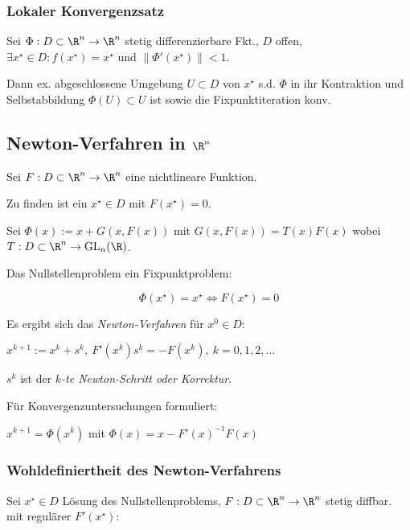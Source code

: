 \subsubsection*{Lokaler Konvergenzsatz}

Sei $\Phi : D \subset \R^n \to \R^n$ stetig differenzierbare Fkt., $D$ offen, $\exists x^\star \in D : f(x^\star)=x^\star$ und $\|\Phi'(x^\star)\| < 1$.

\vspace*{1mm}

Dann ex. abgeschlossene Umgebung $U \subset D$ von $x^\star$ s.d. $\Phi$ in ihr Kontraktion und Selbstabbildung $\Phi(U) \subset U$ ist sowie die Fixpunktiteration konv.

\subsection*{Newton-Verfahren in $\R^n$}

Sei $F : D \subset \R^n \to \R^n$ eine nichtlineare Funktion.

Zu finden ist ein $x^\star \in D$ mit $F(x^\star) = 0$.

\spacing

Sei $\Phi(x) := x + G(x,F(x))$ mit $G(x,F(x)) = T(x)F(x)$ wobei $T : D \subset \R^n \to \text{GL}_n(\R)$.

Das Nullstellenproblem ein Fixpunktproblem:

\vspace*{-2mm}
\[ \Phi(x^\star) = x^\star \iff F(x^\star) = 0 \]

Es ergibt sich das \emph{Newton-Verfahren} für $x^0 \in D$:

$x^{k+1} := x^k + s^k, \ F'(x^k)s^k = -F(x^k), \ k = 0,1,2,\dots$

\vspace*{1mm}

$s^k$ ist der \emph{$k$-te Newton-Schritt oder Korrektur}.

\spacing

Für Konvergenzuntersuchungen formuliert:

$x^{k+1} = \Phi(x^k)$ mit $\Phi(x) = x - F'(x)^{-1}F(x)$

\subsubsection*{Wohldefiniertheit des Newton-Verfahrens}

Sei $x^\star \in D$ Lösung des Nullstellenproblems, $F : D \subset \R^n \to \R^n$ stetig diffbar. mit regulärer $F'(x^\star)$:

